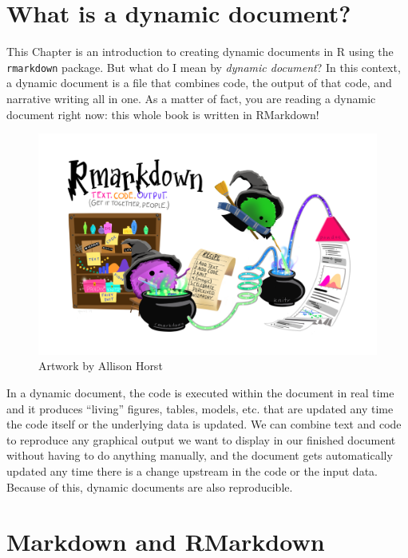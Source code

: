 \documentclass[
]{book}
\begin{document}
\hypertarget{what-is-a-dynamic-document}{%
\section{What is a dynamic document?}\label{what-is-a-dynamic-document}}

This Chapter is an introduction to creating dynamic documents in R using the
\texttt{rmarkdown} package. But what do I mean by \emph{dynamic document}? In this context,
a dynamic document is a file that combines code, the output of that code, and
narrative writing all in one. As a matter of fact, you are reading a dynamic
document right now: this whole book is written in RMarkdown!

\begin{figure}

{\centering \includegraphics[width=0.8\linewidth]{img/rmarkdown_wizards} 

}

\caption{Artwork by Allison Horst}\label{fig:art3}
\end{figure}

In a dynamic document, the code is executed within the document in real
time and it produces ``living'' figures, tables, models, etc. that are updated any
time the code itself or the underlying data is updated. We can combine text and
code to reproduce any graphical output we want to display in our finished
document without having to do anything manually, and the document gets
automatically updated any time there is a change upstream in the code or the
input data. Because of this, dynamic documents are also reproducible.

\hypertarget{markdown-and-rmarkdown}{%
\section{Markdown and RMarkdown}\label{markdown-and-rmarkdown}}
\end{document}
